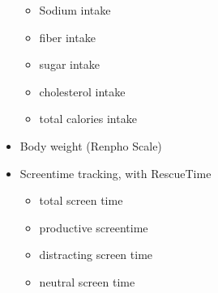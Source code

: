 \documentclass[conference]{IEEEtran}
\begin{document}
\begin{itemize}
\begin{itemize}
\item Sodium intake
\item fiber intake
\item sugar intake
\item cholesterol intake
\item total calories intake
\end{itemize}
\item Body weight (Renpho Scale) 
\item Screentime tracking, with RescueTime
   \begin{itemize}
\item total screen time
\item productive screentime
\item distracting screen time
\item neutral screen time
\end{itemize}
\end{itemize}
\end{document}
